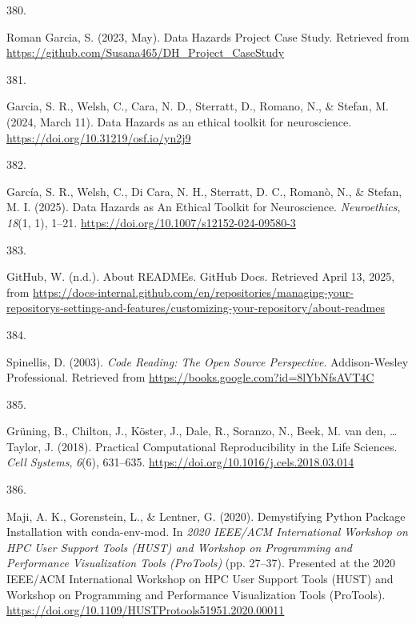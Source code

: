 \documentclass[
  11pt,
  letterpaper,
]{scrreprt}
\newlength{\cslhangindent}
\newlength{\csllabelwidth}
\newenvironment{CSLReferences}[2] %
 {\begin{list}{}{%
  \setlength{\itemindent}{0pt}
  \setlength{\leftmargin}{0pt}
  \setlength{\parsep}{0pt}
  \ifodd #1
   \setlength{\leftmargin}{\cslhangindent}
   \setlength{\itemindent}{-1\cslhangindent}
  \fi
  \setlength{\itemsep}{#2\baselineskip}}}
 {\end{list}}
\newcommand{\CSLLeftMargin}[1]{\parbox[t]{\csllabelwidth}{\strut#1\strut}}
\newcommand{\CSLRightInline}[1]{\parbox[t]{\linewidth - \csllabelwidth}{\strut#1\strut}}
\begin{document}
\begin{CSLReferences}{0}{0}
\CSLLeftMargin{380. }%
\CSLRightInline{Roman Garcia, S. (2023, May). Data {Hazards Project Case
Study}. Retrieved from
\url{https://github.com/Susana465/DH_Project_CaseStudy}}

\CSLLeftMargin{381. }%
\CSLRightInline{Garcia, S. R., Welsh, C., Cara, N. D., Sterratt, D.,
Romano, N., \& Stefan, M. (2024, March 11). Data {Hazards} as an ethical
toolkit for neuroscience. \url{https://doi.org/10.31219/osf.io/yn2j9}}

\CSLLeftMargin{382. }%
\CSLRightInline{García, S. R., Welsh, C., Di Cara, N. H., Sterratt, D.
C., Romanò, N., \& Stefan, M. I. (2025). Data {Hazards} as {An Ethical
Toolkit} for {Neuroscience}. \emph{Neuroethics}, \emph{18}(1, 1), 1--21.
\url{https://doi.org/10.1007/s12152-024-09580-3}}

\CSLLeftMargin{383. }%
\CSLRightInline{GitHub, W. (n.d.). About {READMEs}. GitHub Docs.
Retrieved April 13, 2025, from
\url{https://docs-internal.github.com/en/repositories/managing-your-repositorys-settings-and-features/customizing-your-repository/about-readmes}}

\CSLLeftMargin{384. }%
\CSLRightInline{Spinellis, D. (2003). \emph{Code {Reading}: {The Open
Source Perspective}}. Addison-Wesley Professional. Retrieved from
\url{https://books.google.com?id=8lYbNfsAVT4C}}

\CSLLeftMargin{385. }%
\CSLRightInline{Grüning, B., Chilton, J., Köster, J., Dale, R., Soranzo,
N., Beek, M. van den, \ldots{} Taylor, J. (2018). Practical
{Computational Reproducibility} in the {Life Sciences}. \emph{Cell
Systems}, \emph{6}(6), 631--635.
\url{https://doi.org/10.1016/j.cels.2018.03.014}}

\CSLLeftMargin{386. }%
\CSLRightInline{Maji, A. K., Gorenstein, L., \& Lentner, G. (2020).
Demystifying {Python Package Installation} with conda-env-mod. In
\emph{2020 {IEEE}/{ACM International Workshop} on {HPC User Support
Tools} ({HUST}) and {Workshop} on {Programming} and {Performance
Visualization Tools} ({ProTools})} (pp. 27--37). Presented at the 2020
{IEEE}/{ACM International Workshop} on {HPC User Support Tools} ({HUST})
and {Workshop} on {Programming} and {Performance Visualization Tools}
({ProTools}).
\url{https://doi.org/10.1109/HUSTProtools51951.2020.00011}}


\end{CSLReferences}
\end{document}
